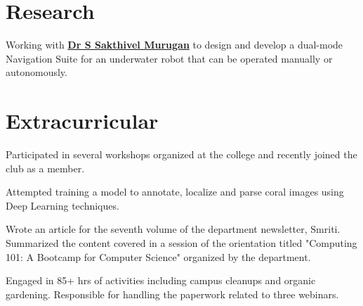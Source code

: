\documentclass[]{deedy-resume-openfont}
\begin{document}
\begin{minipage}[t]{0.64\textwidth}

\section{Research}
Working with \textbf{\href{https://sites.google.com/view/uwarlssn}{Dr S Sakthivel Murugan}} to design and develop a dual-mode Navigation Suite for an underwater robot that can be operated manually or autonomously.  
\sectionsep



\section{Extracurricular}
Participated in several workshops organized at the college and recently joined the club as a member.
\sectionsep

Attempted training a model to annotate, localize and parse coral images using Deep Learning techniques. 
\sectionsep

 Wrote an article for the seventh volume of the department newsletter, Smriti.
 Summarized the content covered in a session of the orientation titled "Computing 101: A Bootcamp for Computer Science" organized by the department.
\sectionsep

Engaged in 85+ hrs of activities including campus cleanups and organic gardening. Responsible for handling the paperwork related to three webinars.  
\sectionsep

\end{minipage} 
\end{document}
